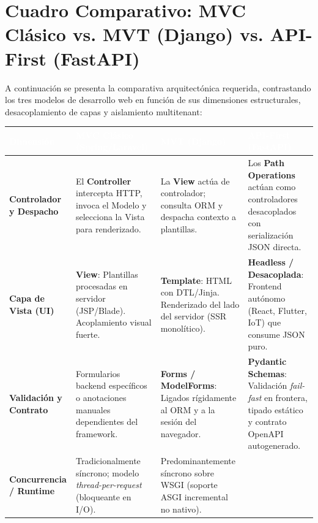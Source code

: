 \documentclass[12pt,a4paper]{article}
\begin{document}
\clearpage
{}
\setcounter{page}{1}

\section{Cuadro Comparativo: MVC Clásico vs. MVT (Django) vs. API-First (FastAPI)}

A continuaci\'{o}n se presenta la comparativa arquitect\'{o}nica requerida, contrastando los tres modelos de desarrollo web en funci\'{o}n de sus dimensiones estructurales, desacoplamiento de capas y aislamiento multitenant:

\begin{table}[H]
\centering
\small
\begin{tabularx}{\textwidth}{@{}L{3.0cm}Y L{3.5cm}Y@{}}
\toprule[1.2pt]
\textcolor{white}{\textbf{Dimensi\'{o}n}} & 
\textcolor{white}{\textbf{MVC Cl\'{a}sico (Spring/Laravel)}} & 
\textcolor{white}{\textbf{MVT (Django)}} & 
\textcolor{white}{\textbf{API-First (FastAPI)}} \\
\midrule[0.8pt]
\textbf{Controlador y Despacho} & 
El \textbf{Controller} intercepta HTTP, invoca el Modelo y selecciona la Vista para renderizado. & 
La \textbf{View} act\'{u}a de controlador; consulta ORM y despacha contexto a plantillas. & 
Los \textbf{Path Operations} act\'{u}an como controladores desacoplados con serializaci\'{o}n JSON directa. \\
\textbf{Capa de Vista (UI)} & 
\textbf{View}: Plantillas procesadas en servidor (JSP/Blade). Acoplamiento visual fuerte. & 
\textbf{Template}: HTML con DTL/Jinja. Renderizado del lado del servidor (SSR monol\'{i}tico). & 
\textbf{Headless / Desacoplada}: Frontend aut\'{o}nomo (React, Flutter, IoT) que consume JSON puro. \\
\textbf{Validaci\'{o}n y Contrato} & 
Formularios backend espec\'{i}ficos o anotaciones manuales dependientes del framework. & 
\textbf{Forms / ModelForms}: Ligados r\'{i}gidamente al ORM y a la sesi\'{o}n del navegador. & 
\textbf{Pydantic Schemas}: Validaci\'{o}n \textit{fail-fast} en frontera, tipado est\'{a}tico y contrato OpenAPI autogenerado. \\
\textbf{Concurrencia / Runtime} & 
Tradicionalmente s\'{i}ncrono; modelo \textit{thread-per-request} (bloqueante en I/O). & 
Predominantemente s\'{i}ncrono sobre WSGI (soporte ASGI incremental no nativo). & 

\end{tabularx}
\end{table}
\end{document}
